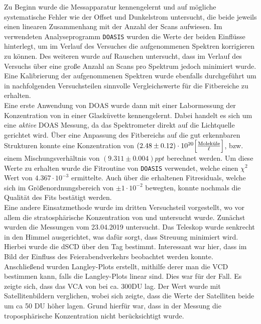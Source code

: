 \documentclass[12pt, a4paper, bibliography=totoc]{scrartcl}
\begin{document}
\begin{multicols}{2}
Zu Beginn wurde die Messapparatur kennengelernt und auf mögliche systematische Fehler wie der Offset und Dunkelstrom untersucht, die beide jeweils einen linearen Zusammenhang mit der Anzahl der Scans aufwiesen. 
Im verwendeten Analyseprogramm \verb*+DOASIS+ wurden die Werte der beiden Einflüsse hinterlegt, um im Verlauf des Versuches die aufgenommenen Spektren korrigieren zu können. 
Des weiteren wurde auf Rauschen untersucht, dass im Verlauf des Versuchs über eine große Anzahl an Scans pro Spektrum jedoch minimiert wurde.
Eine Kalibrierung der aufgenommenen Spektren wurde ebenfalls durchgeführt um in nachfolgenden Versuchsteilen sinnvolle Vergleichswerte für die Fitbereiche zu erhalten.\\

Eine erste Anwendung von DOAS wurde dann mit einer Labormessung der Konzentration von  in einer Glasküvette kennengelernt. 
Dabei handelt es sich um eine \textit{aktive} DOAS Messung, da das Spektrometer direkt auf die Lichtquelle gerichtet wird. 
Über eine Anpassung des Fitbereichs auf die gut erkennbaren  Strukturen konnte eine Konzentration von $(2.48 \pm 0.12) \cdot 10^{20} \Bigl[ \frac{\text{Moleküle}}{\ell}\Bigr]$, bzw. einem Mischungsverhältnis von $(9.311 \pm 0.004) \si{ppt}$ berechnet werden. 
Um diese Werte zu erhalten wurde die Fitroutine von \verb*+DOASIS+ verwendet, welche einen $\chi^2$ Wert von $4.367 \cdot 10^{-3}$ ermittelte. Auch über die erhaltenen Fitresiduals, welche sich im Größenordnungsbereich von $\pm 1 \cdot 10^{-2}$ bewegten, konnte nochmals die Qualität des Fits bestätigt werden.\\

Eine andere Einsatzmethode wurde im dritten Versuchsteil vorgestellt, wo vor allem die stratosphärische Konzentration von  und  untersucht wurde.
Zunächst wurden die Messungen vom 23.04.2019 untersucht.
Das Teleskop wurde senkrecht in den Himmel ausgerichtet, was dafür sorgt, dass Streuung minimiert wird.
Hierbei wurde die dSCD über den Tag bestimmt.
Interessant war hier, dass im  Bild der Einfluss des Feierabendverkehrs beobachtet werden konnte.\\
Anschließend wurden Langley-Plots erstellt, mithilfe derer man die VCD bestimmen kann, falls die Langley-Plots linear sind.
Dies war für  der Fall.
Es zeigte sich, dass das VCA von  bei ca. 300\si{DU} lag.
Der Wert wurde mit Satellitenbildern verglichen, wobei sich zeigte, dass die Werte der Satelliten beide um ca 50 \si{DU} höher lagen.
Grund hierfür war, dass in der Messung die troposphärische Konzentration nicht berücksichtigt wurde.\\


\end{multicols}
\end{document}
